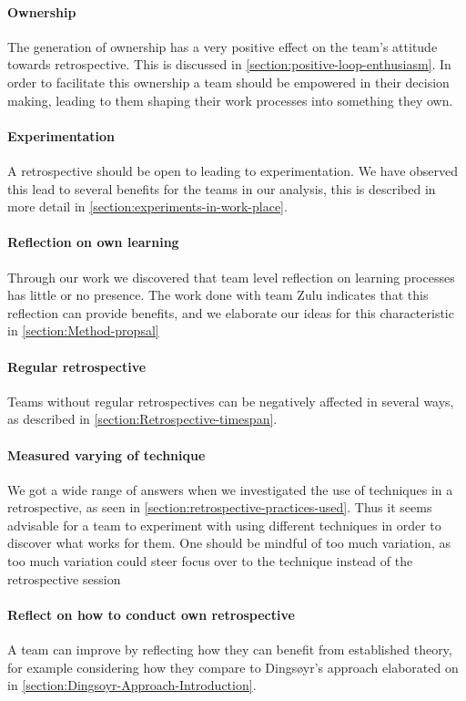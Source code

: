 \paragraph{Ownership}
The generation of ownership has a very positive effect on the team's attitude towards retrospective. This is discussed in \autoref{section:positive-loop-enthusiasm}. In order to facilitate this ownership a team should be empowered in their decision making, leading to them shaping their work processes into something they own.

\paragraph{Experimentation}
A retrospective should be open to leading to experimentation. We have observed this lead to several benefits for the teams in our analysis, this is described in more detail in \autoref{section:experiments-in-work-place}. 

\paragraph{Reflection on own learning}
Through our work we discovered that team level reflection on learning processes has little or no presence. The work done with team Zulu indicates that this reflection can provide benefits, and we elaborate our ideas for this characteristic in \autoref{section:Method-propsal}

\paragraph{Regular retrospective}
Teams without regular retrospectives can be negatively affected in several ways, as described in \autoref{section:Retrospective-timespan}. 

\paragraph{Measured varying of technique}
We got a wide range of answers when we investigated the use of techniques in a retrospective, as seen in \autoref{section:retrospective-practices-used}. Thus it seems advisable for a team to experiment with using different techniques in order to discover what works for them. One should be mindful of too much variation, as too much variation could steer focus over to the technique instead of the retrospective session

\paragraph{Reflect on how to conduct own retrospective} %
A team can improve by reflecting how they can benefit from established theory, for example considering how they compare to Dingsøyr's approach elaborated on in \autoref{section:Dingsoyr-Approach-Introduction}.



